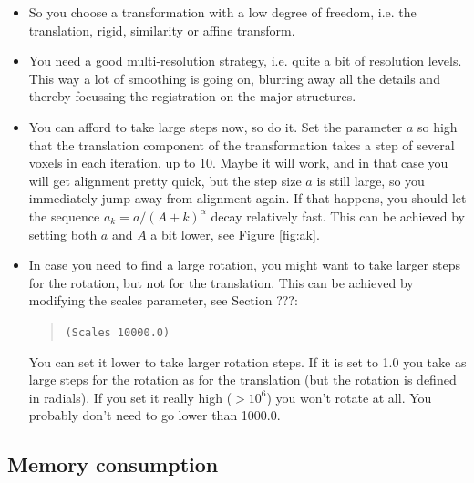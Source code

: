 \documentclass[]{report}
\begin{document}
\begin{itemize}
\item So you choose a transformation with a low degree of freedom,
i.e. the translation, rigid, similarity or affine transform.

\item You need a good multi-resolution strategy, i.e.
quite a bit of resolution levels. This way a lot of smoothing is
going on, blurring away all the details and thereby focussing the
registration on the major structures.

\item You can afford to take large steps now, so do it. Set the
parameter $a$ so high that the translation component of the
transformation takes a step of several voxels in each iteration, up
to 10. Maybe it will work, and in that case you will get alignment
pretty quick, but the step size $a$ is still large, so you
immediately jump away from alignment again. If that happens, you
should let the sequence $a_k = a / (A+k)^{\alpha}$ decay relatively
fast. This can be achieved by setting both $a$ and $A$ a bit lower,
see Figure \ref{fig:ak}.

\item In case you need to find a large rotation, you might want to
take larger steps for the rotation, but not for the translation. This
can be achieved by modifying the scales parameter, see Section ???:
\begin{quote}
\texttt{(Scales 10000.0)}
\end{quote}
You can set it lower to take larger rotation steps. If it is set to
1.0 you take as large steps for the rotation as for the translation
(but the rotation is defined in radials). If you set it really high
($> 10^6$) you won't rotate at all. You probably don't need to go
lower than 1000.0.

\end{itemize}

\subsection{Memory consumption}\label{ssec:tut:memory}
\end{document}
